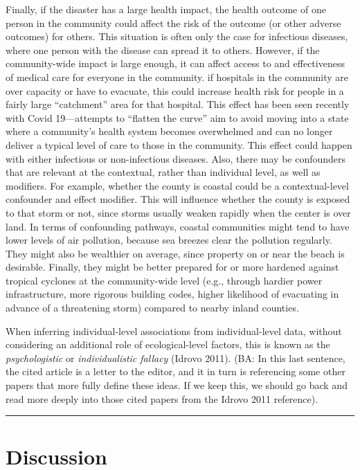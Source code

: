\documentclass[]{article}
\begin{document}
Finally, if the disaster has a large health impact, the health outcome
of one person in the community could affect the risk of the outcome (or
other adverse outcomes) for others. This situation is often only the
case for infectious diseases, where one person with the disease can
spread it to others. However, if the community-wide impact is large
enough, it can affect access to and effectiveness of medical care for
everyone in the community. if hospitals in the community are over
capacity or have to evacuate, this could increase health risk for people
in a fairly large ``catchment'' area for that hospital. This effect has
been seen recently with Covid 19---attempts to ``flatten the curve'' aim
to avoid moving into a state where a community's health system becomes
overwhelmed and can no longer deliver a typical level of care to those
in the community. This effect could happen with either infectious or
non-infectious diseases. Also, there may be confounders that are
relevant at the contextual, rather than individual level, as well as
modifiers. For example, whether the county is coastal could be a
contextual-level confounder and effect modifier. This will influence
whether the county is exposed to that storm or not, since storms usually
weaken rapidly when the center is over land. In terms of confounding
pathways, coastal communities might tend to have lower levels of air
pollution, because sea breezes clear the pollution regularly. They might
also be wealthier on average, since property on or near the beach is
desirable. Finally, they might be better prepared for or more hardened
against tropical cyclones at the community-wide level (e.g., through
hardier power infrastructure, more rigorous building codes, higher
likelihood of evacuating in advance of a threatening storm) compared to
nearby inland counties.

When inferring individual-level associations from individual-level data,
without considering an additional role of ecological-level factors, this
is known as the \emph{psychologistic} or \emph{individualistic fallacy}
(Idrovo 2011). (BA: In this last sentence, the cited article is a letter
to the editor, and it in turn is referencing some other papers that more
fully define these ideas. If we keep this, we should go back and read
more deeply into those cited papers from the Idrovo 2011 reference).

\begin{center}\rule{0.5\linewidth}{0.5pt}\end{center}

\section{Discussion}\label{discussion}
\end{document}

